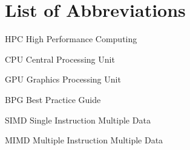\section*{List of Abbreviations}


\begin{abbrv}
\item[HPC]                   High Performance Computing
\item[CPU]                   Central Processing Unit
\item[GPU]                   Graphics Processing Unit
\item[BPG]                   Best Practice Guide
\item[SIMD]                  Single Instruction Multiple Data
\item[MIMD]                  Multiple Instruction Multiple Data

\end{abbrv}
